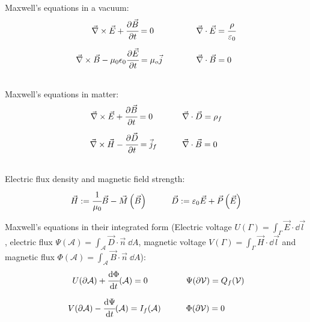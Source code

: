 		\noindent
		Maxwell's equations in a vacuum:
		\begin{equation}
		\begin{array}{rl}
			\vec{\nabla}\times \vec{E} + \cfrac{\partial\vec{B}}{\partial t} = 0 \phantom{\mu_0}
			&\hspace{30pt} \vec{\nabla}\cdot\vec{E} = \cfrac{\rho}{\varepsilon_0} \\ \xrowht{40pt}
			\vec{\nabla}\times\vec{B} - \mu_0 \epsilon_0 \cfrac{\partial \vec{E}}{\partial t} = \mu_o\vec{j}
			&\hspace{30pt} \vec{\nabla}\cdot\vec{B} = 0 \\
		\end{array}
		\end{equation}

		\noindent
		Maxwell's equations in matter:
		\begin{equation}
		\begin{array}{rl}
			\vec{\nabla}\times \vec{E} + \cfrac{\partial\vec{B}}{\partial t} = 0 \phantom{_f}
			&\hspace{20pt} \vec{\nabla}\cdot\vec{D} = \rho_f\\ \xrowht{40pt}
			\vec{\nabla}\times\vec{H} - \cfrac{\partial \vec{D}}{\partial t} = \vec{j}_f
			&\hspace{20pt} \vec{\nabla}\cdot\vec{B} = 0 \\
		\end{array}
		\end{equation}

		\noindent
		Electric flux density and magnetic field strength:
		\begin{equation} \label{Eq:FluxDensityFieldStrength}
		\begin{array}{cc}
			\vec{H} := \cfrac{1}{\mu_0}\Vec{B} - \vec{M}\left(\vec{B}\right)
			&\hspace{20pt} \vec{D} := \varepsilon_0\vec{E} + \vec{P}\left(\vec{E}\right)
		\end{array}
		\end{equation}


		\noindent
		Maxwell's equations in their integrated form (Electric voltage $U(\Gamma)=\int_\Gamma \vec{E}\cdot\dd\vec{l}$, electric flux $\Psi(\mathcal{A})=\int_\mathcal{A}\vec{D}\cdot\vec{n}\;\dd A$, magnetic voltage $V(\Gamma)=\int_\Gamma \vec{H}\cdot\dd\vec{l}$ and magnetic flux $\Phi(\mathcal{A})=\int_\mathcal{A}\vec{B}\cdot\vec{n}\;\dd A$):
		\begin{equation}
		\begin{array}{rl}
			U(\partial \mathcal{A}) + \cfrac{\dd\Phi}{\dd t}(\mathcal{A}) = 0\phantom{(\mathcal{A})}
			&\hspace{20pt} \Psi(\partial\mathcal{V}) = Q_f(\mathcal{V}) \\ \xrowht{40pt}
			V(\partial \mathcal{A}) - \cfrac{\dd \Psi}{\dd t}(\mathcal{A}) = I_f(\mathcal{A})
			&\hspace{20pt} \Phi(\partial\mathcal{V}) = 0 \\
		\end{array}
		\end{equation}


